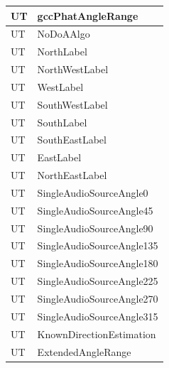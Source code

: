 \documentclass[12pt, titlepage]{article}
\newcounter{unitTest}
\newcommand{\mtheunitTest}{UT\theunitTest}
\begin{document}
{\begin{longtable}{|p{2cm}|p{11cm}|}
    {unitTest} \mtheunitTest \label{gccPhatAngleRange} &
    gccPhatAngleRange \\ \hline
    {unitTest} \mtheunitTest \label{NoDoAAlgo} & NoDoAAlgo \\
    \hline
    {unitTest} \mtheunitTest \label{NorthLabel} & NorthLabel \\
    \hline
    {unitTest} \mtheunitTest \label{NorthWestLabel} &
    NorthWestLabel \\ \hline
    {unitTest} \mtheunitTest \label{WestLabel} & WestLabel \\
    \hline
    {unitTest} \mtheunitTest \label{SouthWestLabel} &
    SouthWestLabel \\ \hline
    {unitTest} \mtheunitTest \label{SouthLabel} & SouthLabel \\
    \hline
    {unitTest} \mtheunitTest \label{SouthEastLabel} &
    SouthEastLabel \\ \hline
    {unitTest} \mtheunitTest \label{EastLabel} & EastLabel \\
    \hline
    {unitTest} \mtheunitTest \label{NorthEastLabel} &
    NorthEastLabel \\ \hline
    {unitTest} \mtheunitTest \label{SingleAudioSourceAngle0} &
    SingleAudioSourceAngle0 \\ \hline
    {unitTest} \mtheunitTest \label{SingleAudioSourceAngle45} &
    SingleAudioSourceAngle45 \\ \hline
    {unitTest} \mtheunitTest \label{SingleAudioSourceAngle90} &
    SingleAudioSourceAngle90 \\ \hline
    {unitTest} \mtheunitTest \label{SingleAudioSourceAngle135} &
    SingleAudioSourceAngle135 \\ \hline
    {unitTest} \mtheunitTest \label{SingleAudioSourceAngle180} &
    SingleAudioSourceAngle180 \\ \hline
    {unitTest} \mtheunitTest \label{SingleAudioSourceAngle225} &
    SingleAudioSourceAngle225 \\ \hline
    {unitTest} \mtheunitTest \label{SingleAudioSourceAngle270} &
    SingleAudioSourceAngle270 \\ \hline
    {unitTest} \mtheunitTest \label{SingleAudioSourceAngle315} &
    SingleAudioSourceAngle315 \\ \hline
    {unitTest} \mtheunitTest \label{KnownDirectionEstimation} &
    KnownDirectionEstimation \\ \hline
    {unitTest} \mtheunitTest \label{ExtendedAngleRange} &
    ExtendedAngleRange \\ \hline


\end{longtable}}
\end{document}
